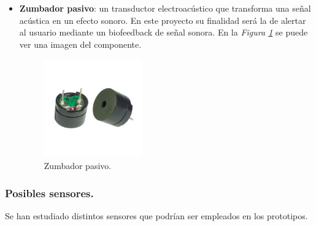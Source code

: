 \begin{itemize}
\newpage
\item \textbf{Zumbador pasivo}: un transductor electroacústico que transforma una señal acústica en un efecto sonoro. En este proyecto su finalidad será la de alertar al usuario mediante un biofeedback de señal sonora. En la \textit{Figura \ref{fig:zumbador}} se puede ver una imagen del componente.
\begin{figure}[h!]
    \centering
    \includegraphics[width=0.4\textwidth]{img/imgZumbador.jpg}
    \caption{Zumbador pasivo.\cite{imgZumbador}}
    \label{fig:zumbador} 
\end{figure}

\end{itemize}

\newpage
\subsubsection{Posibles sensores.}

Se han estudiado distintos sensores que podrían ser empleados en los prototipos.

